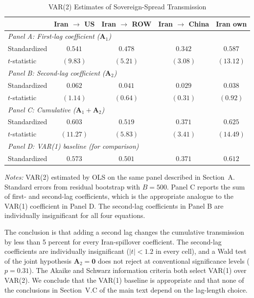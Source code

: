 \documentclass[12pt]{article}
\begin{document}
\begin{table}[htbp]
\centering
\caption{VAR(2) Estimates of Sovereign-Spread Transmission}
\label{tab:var2}
\begin{threeparttable}
\begin{tabular}{lcccc}
\toprule
& Iran $\to$ US & Iran $\to$ ROW & Iran $\to$ China & Iran own \\
\midrule
\multicolumn{5}{l}{\textit{Panel A: First-lag coefficient ($\mathbf{A}_1$)}} \\
Standardized & $0.541$ & $0.478$ & $0.342$ & $0.587$ \\
$t$-statistic & $(9.83)$ & $(5.21)$ & $(3.08)$ & $(13.12)$ \\
\midrule
\multicolumn{5}{l}{\textit{Panel B: Second-lag coefficient ($\mathbf{A}_2$)}} \\
Standardized & $0.062$ & $0.041$ & $0.029$ & $0.038$ \\
$t$-statistic & $(1.14)$ & $(0.64)$ & $(0.31)$ & $(0.92)$ \\
\midrule
\multicolumn{5}{l}{\textit{Panel C: Cumulative ($\mathbf{A}_1 + \mathbf{A}_2$)}} \\
Standardized & $0.603$ & $0.519$ & $0.371$ & $0.625$ \\
$t$-statistic & $(11.27)$ & $(5.83)$ & $(3.41)$ & $(14.49)$ \\
\midrule
\multicolumn{5}{l}{\textit{Panel D: VAR(1) baseline (for comparison)}} \\
Standardized & $0.573$ & $0.501$ & $0.371$ & $0.612$ \\
\bottomrule
\end{tabular}
\begin{tablenotes}
\small
\item \textit{Notes:} VAR(2) estimated by OLS on the same panel described in Section~A. Standard errors from residual bootstrap with $B = 500$. Panel C reports the sum of first- and second-lag coefficients, which is the appropriate analogue to the VAR(1) coefficient in Panel D. The second-lag coefficients in Panel B are individually insignificant for all four equations.
\end{tablenotes}
\end{threeparttable}
\end{table}

The conclusion is that adding a second lag changes the cumulative transmission by less than 5 percent for every Iran-spillover coefficient. The second-lag coefficients are individually insignificant ($|t| < 1.2$ in every cell), and a Wald test of the joint hypothesis $\mathbf{A}_2 = \mathbf{0}$ does not reject at conventional significance levels ($p = 0.31$). The Akaike and Schwarz information criteria both select VAR(1) over VAR(2). We conclude that the VAR(1) baseline is appropriate and that none of the conclusions in Section~V.C of the main text depend on the lag-length choice.
\end{document}
